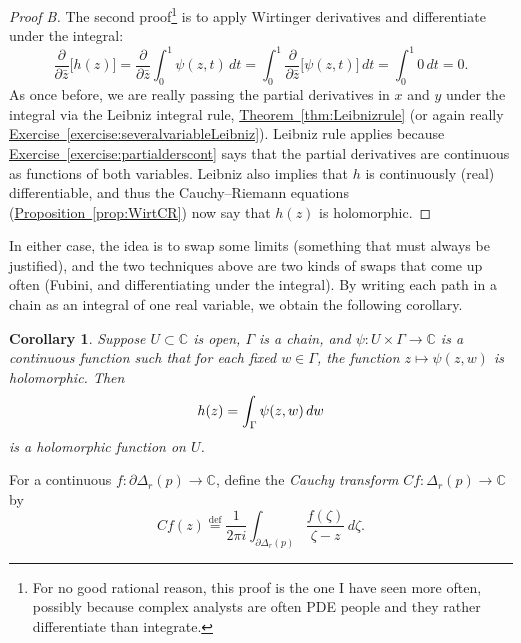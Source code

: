 \documentclass[12pt,openany]{book}
\newcommand{\avoidbreak}{\postdisplaypenalty=100}
\newcommand{\C}{{\mathbb{C}}}
\newcommand{\myindex}[1]{#1\index{#1}}
\theoremstyle{plain}
\newtheorem{cor}[thm]{Corollary}
\theoremstyle{remark}
\theoremstyle{definition}
\theoremstyle{exercise}
\theoremstyle{example}
\newcommand{\exerciseref}[1]{\hyperref[#1]{Exercise~\ref*{#1}}}
\newcommand{\thmref}[1]{\hyperref[#1]{Theorem~\ref*{#1}}}
\newcommand{\propref}[1]{\hyperref[#1]{Proposition~\ref*{#1}}}
\begin{document}
\begin{proof}[Proof B]
The second proof\footnote{%
For no good rational reason, this proof is the one I have seen more often,
possibly because complex analysts are often PDE
people and they rather differentiate than integrate.}
is to apply Wirtinger derivatives and differentiate under the integral:
\begin{equation*}
\frac{\partial}{\partial \bar{z}}
\bigl[
h(z)
\bigr]
=
\frac{\partial}{\partial \bar{z}}
\int_0^1 \psi(z,t) \, dt
=
\int_0^1
\frac{\partial}{\partial \bar{z}}
\bigl[
\psi(z,t)
\bigr]
\, dt
= \int_0^1 0 \, dt = 0.
\end{equation*}
As once before, we are really passing the partial derivatives in $x$
and $y$ under the integral via the Leibniz integral rule,
\thmref{thm:Leibnizrule} (or again really
\exerciseref{exercise:severalvariableLeibniz}).
Leibniz rule applies because 
\exerciseref{exercise:partialderscont} says that the partial
derivatives are continuous as functions of both variables.
Leibniz also implies that $h$ is continuously (real) differentiable,
and thus
the Cauchy--Riemann equations
(\propref{prop:WirtCR}) now
say that $h(z)$ is holomorphic.
\end{proof}

In either case, the idea is to swap some limits (something that must always
be justified),
and the two techniques above are two kinds of swaps that come up
often (Fubini, and differentiating under the integral).  By writing each
path in a chain as an integral of one real variable, we obtain the following
corollary.

\begin{cor} \label{cor:holfuncbyintegral}
Suppose $U \subset \C$ is open, $\Gamma$ is a 
chain,
and
$\psi \colon U \times \Gamma \to \C$ is a continuous function such that
for each fixed $w \in \Gamma$, the function $z \mapsto \psi(z,w)$ is
holomorphic.  Then
\begin{equation*}
h(z) =
\int_\Gamma \psi(z,w) \, dw
\avoidbreak
\end{equation*}
is a holomorphic function on $U$.
\end{cor}

For a continuous $f \colon \partial \Delta_r(p) \to \C$, define
the \emph{\myindex{Cauchy transform}} $Cf \colon \Delta_r(p) \to \C$ by
%
\begin{equation*}
Cf(z)
\overset{\text{def}}{=}
\frac{1}{2\pi i}
\int_{\partial \Delta_r(p)}
\frac{f(\zeta)}{\zeta-z}\, d\zeta .
\end{equation*}
\end{document}
